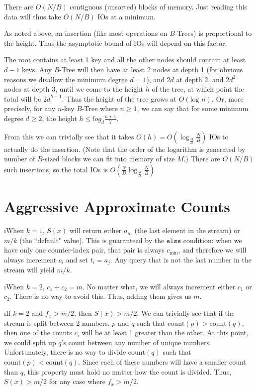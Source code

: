 \documentclass[fleqn]{article}
\begin{document}
There are $O(N/B)$ contiguous (unsorted) blocks of memory. Just reading this data will thus take $O(N/B)$ IOs at a minimum.

As noted above, an insertion (like most operations on $B$-Trees) is proportional to the height. Thus the asymptotic bound of IOs will depend on this factor.

The root contains at least 1 key and all the other nodes should contain at least $d - 1$ keys. Any $B$-Tree will then have at least 2 nodes at depth 1 (for obvious reasons we disallow the minimum degree $d = 1$), and 2$d$ at depth 2, and 2$d^2$ nodes at depth 3, until we come to the height $h$ of the tree, at which point the total will be 2$d^{h-1}$. Thus the height of the tree grows at $O(\mbox{log } n)$. Or, more precisely, for any $n$-key $B$-Tree where $n \ge 1$, we can say that for some minimum degree $d \ge 2$, the height $h \le log_d \frac{n+1}{2}$.

From this we can trivially see that it takes $O(h) = O(\log_\frac{M}{B}\frac{N}{B})$ IOs to actually do the insertion. (Note that the order of the logarithm is generated by number of $B$-sized blocks we can fit into memory of size $M$.) There are $O(N/B)$ such insertions, so the total IOs is $O(\frac{N}{B} \log_\frac{M}{B}\frac{N}{B})$


\section{Aggressive Approximate Counts}

\bee
\i When $k=1$, $S(x)$ will return either $a_m$ (the last element in the stream) or $m/k$ (the ``default" value). This is guaranteed by the $\texttt{else}$ condition: when we have only one counter-index pair, that pair is always $c_{\mbox{min}}$, and therefore we will always increment $c_i$ and set $t_i = a_j$. Any query that is not the last number in the stream will yield $m/k$.

\i When $k=2$, $c_1 + c_2 = m$. No matter what, we will always increment either $c_1$ or $c_2$. There is no way to avoid this. Thus, adding them gives us $m$.

\i If $k=2$ and $f_x > m/2$, then $S(x) > m/2$. We can trivially see that if the stream is split between 2 numbers, $p$ and $q$ such that $\mbox{count}(p) > \mbox{count}(q)$, then one of the counts $c_i$ will be at least 1 greater than the other. At this point, we could split up $q$'s count between any number of unique numbers. Unfortunately, there is no way to divide $\mbox{count}(q)$ such that $\mbox{count}(p) < \mbox{count}(q)$. Since each of these numbers will have a smaller count than $q$, this property must hold no matter how the count is divided. Thus, $S(x) > m/2$ for any case where $f_x > m/2$.
\end{document}
